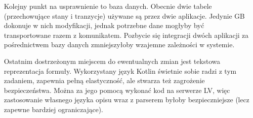 Kolejny punkt na usprawnienie to baza danych.
Obecnie dwie tabele (przechowujące stany i tranzycje) używane są przez dwie aplikacje.
Jedynie GB dokonuje w nich modyfikacji, jednak potrzebne dane mogłyby być transportowane razem z komunikatem.
Pozbycie się integracji dwóch aplikacji za pośrednictwem bazy danych zmniejszyłoby wzajemne zależności w systemie.

Ostatnim dostrzeżonym miejscem do ewentualnych zmian jest tekstowa reprezentacja formuły.
Wykorzystany język Kotlin świetnie sobie radzi z tym zadaniem, zapewnia pełną elastyczność, ale stwarza też zagrożenie bezpieczeństwa.
Można za jego pomocą wykonać kod na serwerze LV, więc zastosowanie własnego języka opisu wraz z parserem byłoby bezpieczniejsze (lecz zapewne bardziej ograniczające).
